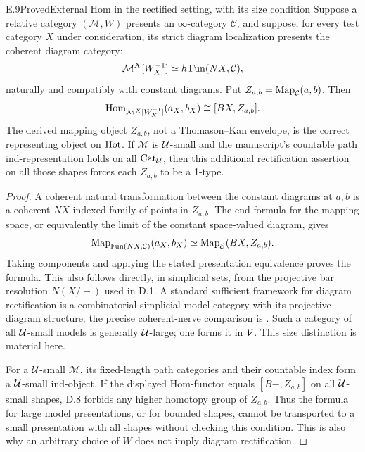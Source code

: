 \begin{claim}{E.9}{Proved}{External Hom in the rectified setting, with its size condition}
Suppose a relative category $(\mathcal M,W)$ presents an $\infty$-category $\mathcal C$, and suppose, for every test category $X$ under consideration, its strict diagram localization presents the coherent diagram category:
\[
 \mathcal M^X[W_X^{-1}]\simeq h\operatorname{Fun}(NX,\mathcal C),
\]
naturally and compatibly with constant diagrams. Put $Z_{a,b}=\operatorname{Map}_{\mathcal C}(a,b)$. Then
\[
 \operatorname{Hom}_{\mathcal M^X[W_X^{-1}]}(a_X,b_X)
 \cong[BX,Z_{a,b}].
\]
The derived mapping object $Z_{a,b}$, not a Thomason--Kan envelope, is the correct representing object on $\mathrm{Hot}$. If $\mathcal M$ is $\mathcal U$-small and the manuscript's countable path ind-representation holds on all $\mathrm{Cat}_\mathcal U$, then this additional rectification assertion on all those shapes forces each $Z_{a,b}$ to be a 1-type.
\end{claim}
\begin{proof}
A coherent natural transformation between the constant diagrams at $a,b$ is a coherent $NX$-indexed family of points in $Z_{a,b}$. The end formula for the mapping space, or equivalently the limit of the constant space-valued diagram, gives
\[
 \operatorname{Map}_{\operatorname{Fun}(NX,\mathcal C)}(a_X,b_X)
 \simeq\operatorname{Map}_{\mathcal S}(BX,Z_{a,b}).
\]
Taking components and applying the stated presentation equivalence proves the formula. This also follows directly, in simplicial sets, from the projective bar resolution $N(X/-)$ used in D.1. A standard sufficient framework for diagram rectification is a combinatorial simplicial model category with its projective diagram structure; the precise coherent-nerve comparison is \citet[Proposition~4.2.4.4]{Lurie2009}. Such a category of all $\mathcal U$-small models is generally $\mathcal U$-large; one forms it in $\mathcal V$. This size distinction is material here.

For a $\mathcal U$-small $\mathcal M$, its fixed-length path categories and their countable index form a $\mathcal U$-small ind-object. If the displayed Hom-functor equals $[B-,Z_{a,b}]$ on all $\mathcal U$-small shapes, D.8 forbids any higher homotopy group of $Z_{a,b}$. Thus the formula for large model presentations, or for bounded shapes, cannot be transported to a small presentation with all shapes without checking this condition. This is also why an arbitrary choice of $W$ does not imply diagram rectification.
\end{proof}

